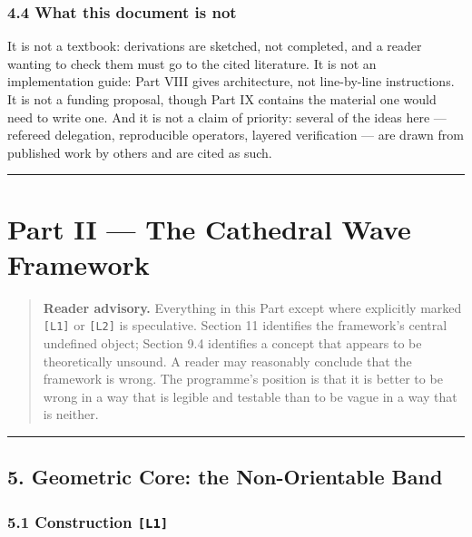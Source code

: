 \documentclass[
  11pt]{report}
\begin{document}
\hypertarget{what-this-document-is-not}{%
\section{4.4 What this document is
not}\label{what-this-document-is-not}}

It is not a textbook: derivations are sketched, not completed, and a
reader wanting to check them must go to the cited literature. It is not
an implementation guide: Part VIII gives architecture, not line-by-line
instructions. It is not a funding proposal, though Part IX contains the
material one would need to write one. And it is not a claim of priority:
several of the ideas here --- refereed delegation, reproducible
operators, layered verification --- are drawn from published work by
others and are cited as such.

\begin{center}\rule{0.5\linewidth}{0.5pt}\end{center}

\hypertarget{part-ii-the-cathedral-wave-framework}{%
\part{Part II --- The Cathedral Wave
Framework}\label{part-ii-the-cathedral-wave-framework}}

\begin{quote}
\textbf{Reader advisory.} Everything in this Part except where
explicitly marked \texttt{{[}L1{]}} or \texttt{{[}L2{]}} is speculative.
Section 11 identifies the framework's central undefined object; Section
9.4 identifies a concept that appears to be theoretically unsound. A
reader may reasonably conclude that the framework is wrong. The
programme's position is that it is better to be wrong in a way that is
legible and testable than to be vague in a way that is neither.
\end{quote}

\begin{center}\rule{0.5\linewidth}{0.5pt}\end{center}

\hypertarget{geometric-core-the-non-orientable-band}{%
\chapter{5. Geometric Core: the Non-Orientable
Band}\label{geometric-core-the-non-orientable-band}}

\hypertarget{construction-l1}{%
\section{\texorpdfstring{5.1 Construction
\texttt{{[}L1{]}}}{5.1 Construction {[}L1{]}}}\label{construction-l1}}
\end{document}
